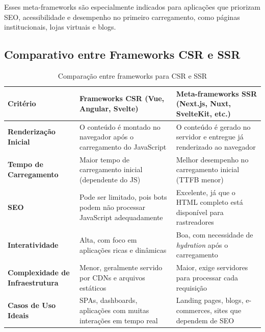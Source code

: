 Esses meta-frameworks são especialmente indicados para aplicações que priorizam SEO, acessibilidade e desempenho no primeiro carregamento, como páginas institucionais, lojas virtuais e blogs.

\subsection{Comparativo entre Frameworks CSR e SSR}
\label{subsec:comparativo-frameworks}

\begin{table}[H]
\centering
\caption{Comparação entre frameworks para CSR e SSR}
\label{tab:comparativo-frameworks}
\begin{tabular}{|p{3cm}|p{5.5cm}|p{5.5cm}|}
\hline
\textbf{Critério} & \textbf{Frameworks CSR (Vue, Angular, Svelte)} & \textbf{Meta-frameworks SSR (Next.js, Nuxt, SvelteKit, etc.)} \\
\hline
\textbf{Renderização Inicial} & O conteúdo é montado no navegador após o carregamento do JavaScript & O conteúdo é gerado no servidor e entregue já renderizado ao navegador \\
\hline
\textbf{Tempo de Carregamento} & Maior tempo de carregamento inicial (dependente do JS) & Melhor desempenho no carregamento inicial (TTFB menor) \\
\hline
\textbf{SEO} & Pode ser limitado, pois bots podem não processar JavaScript adequadamente & Excelente, já que o HTML completo está disponível para rastreadores \\
\hline
\textbf{Interatividade} & Alta, com foco em aplicações ricas e dinâmicas & Boa, com necessidade de \textit{hydration} após o carregamento \\
\hline
\textbf{Complexidade de Infraestrutura} & Menor, geralmente servido por CDNs e arquivos estáticos & Maior, exige servidores para processar cada requisição \\
\hline
\textbf{Casos de Uso Ideais} & SPAs, dashboards, aplicações com muitas interações em tempo real & Landing pages, blogs, e-commerces, sites que dependem de SEO \\
\hline
\end{tabular}
\end{table}



